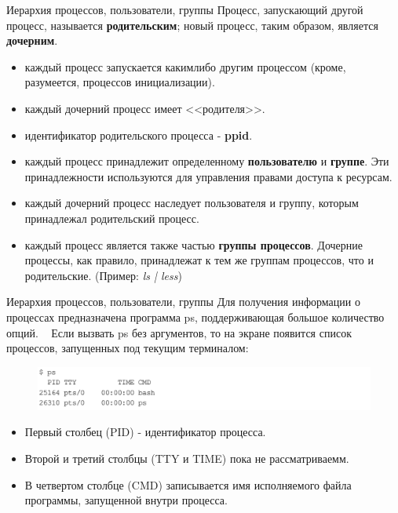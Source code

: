 \documentclass[xcolor=table]{beamer}
\begin{document}
\begin{frame}{Иерархия процессов, пользователи, группы}
	Процесс, запускающий другой процесс, называется \textbf{родительским}; новый процесс, таким образом, является \textbf{дочерним}.
	\begin{itemize}
		\item каждый процесс запускается каким­либо другим процессом (кроме, разумеется, процессов инициализации). 
		\item каждый дочерний процесс имеет <<родителя>>. 
		\item идентификатор родительского процесса - \textbf{ppid}.
		\item каждый процесс принадлежит определенному \textbf{пользователю} и \textbf{группе}. Эти принадлежности используются для управления правами доступа к ресурсам. 
		\item каждый дочерний процесс наследует пользователя и группу, которым принадлежал родительский процесс.
		\item каждый процесс является также частью \textbf{группы процессов}. Дочерние процессы, как правило, принадлежат к тем же группам процессов, что и родительские.
	(Пример: \textit{ls | less}) 
	\end{itemize}
\end{frame}

\begin{frame}{Иерархия процессов, пользователи, группы}
	Для получения информации о процессах предназначена программа ps, поддерживающая большое количество опций.
	~
	Если вызвать ps без аргументов, то на экране появится список процессов, запущенных под текущим терминалом:
	\begin{figure}[h]
		\centering
		\includegraphics[scale=0.5]{images/lec07-pic22.png}
	\end{figure}
	\begin{itemize}
		\item Первый столбец (PID) - идентификатор процесса. 
		\item Второй и третий столбцы (TTY и TIME) пока не рассматриваемм. 
		\item В четвертом столбце (CMD) записывается имя исполняемого файла программы, запущенной внутри процесса.
	\end{itemize}
\end{frame}
\end{document}
